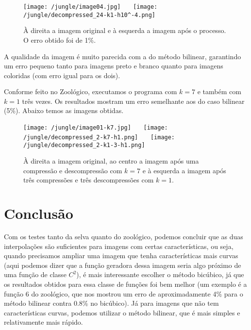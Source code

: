\documentclass{article}
\begin{document}
		\begin{figure}[H]
			\centering
			\captionsetup{justification=centering}
			\texttt{[image: /jungle/image04.jpg]} \ \ \
			\texttt{[image: /jungle/decompressed\_24-k1-h10^-4.png]} \\
			\caption{À direita a imagem original e à esquerda a imagem após o processo. O erro obtido foi de 1\%.}  
		\end{figure}\par
		A qualidade da imagem é muito parecida com a do método bilinear, garantindo um erro pequeno tanto para imagens preto e branco quanto para imagens coloridas (com erro igual para os dois).\par
		Conforme feito no Zoológico, executamos o programa com $k = 7$ e também com $k = 1$ três vezes. Os resultados mostram um erro semelhante aos do caso bilinear (5\%). Abaixo temos as imagens obtidas.
		
		\begin{figure}[H]
			\centering
			\captionsetup{justification=centering}
			\texttt{[image: /jungle/image01-k7.jpg]} \ \ \
			\texttt{[image: /jungle/decompressed\_2-k7-h1.png]} \ \ \
			\texttt{[image: /jungle/decompressed\_2-k1-3-h1.png]} \\
			\caption{À direita a imagem original, ao centro a imagem após uma compressão e descompressão com $k = 7$ e à esquerda a imagem após três compressões e três descompressões com $k = 1$.}  
		\end{figure}\par
	
	\pagebreak
	\section{Conclusão}
	Com os testes tanto da selva quanto do zoológico, podemos concluir que as duas interpolações são suficientes para imagens com certas características, ou seja, quando precisamos ampliar uma imagem que tenha características mais curvas (aqui podemos dizer que a função geradora dessa imagem seria algo próximo de uma função de classe $C^2$), é mais interessante escolher o método bicúbico, já que os resultados obtidos para essa classe de funções foi bem melhor (um exemplo é a função 6 do zoológico, que nos mostrou um erro de aproximadamente 4\% para o método bilinear contra 0.8\% no bicúbico). Já para imagens que não tem características curvas, podemos utilizar o método bilinear, que é mais simples e relativamente mais rápido.
\end{document}
